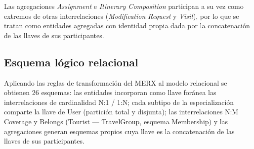 \documentclass[11pt,a4paper]{article}
\begin{document}
\vspace{2pt}
Las agregaciones \textit{Assignment} e \textit{Itinerary Composition} participan a su vez como extremos de otras interrelaciones (\textit{Modification Request} y \textit{Visit}), por lo que se tratan como entidades agregadas con identidad propia dada por la concatenación de las llaves de sus participantes.

\subsection{Esquema lógico relacional}\label{sec:esquema-logico}
Aplicando las reglas de transformación del MERX al modelo relacional se obtienen 26 esquemas: las entidades incorporan como llave foránea las interrelaciones de cardinalidad N:1 / 1:N; cada subtipo de la especialización comparte la llave de User (partición total y disjunta); las interrelaciones N:M Coverage y Belongs (Tourist — TravelGroup, esquema Membership) y las agregaciones generan esquemas propios cuya llave es la concatenación de las llaves de sus participantes.
\end{document}
